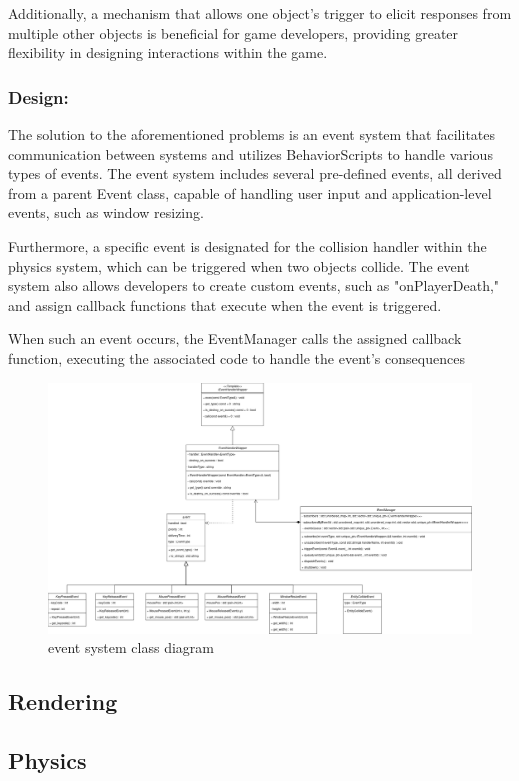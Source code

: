 \documentclass{projdoc}
\begin{document}
Additionally, a mechanism that allows one object's trigger to elicit responses from multiple other objects is beneficial for game developers, providing greater flexibility in designing interactions within the game.

\subsubsection{Design:}
The solution to the aforementioned problems is an event system that facilitates communication between systems and utilizes BehaviorScripts to handle various types of events. The event system includes several pre-defined events, all derived from a parent Event class, capable of handling user input and application-level events, such as window resizing.

Furthermore, a specific event is designated for the collision handler within the physics system, which can be triggered when two objects collide. The event system also allows developers to create custom events, such as "onPlayerDeath," and assign callback functions that execute when the event is triggered.

When such an event occurs, the EventManager calls the assigned callback function, executing the associated code to handle the event's consequences
\begin{figure}
    \centering
    \includegraphics[width=\linewidth]{img/event-uml.drawio.png}  %
    \caption{event system class diagram}
    \label{fig:event-uml}
\end{figure}
\subsection{Rendering}

\subsection{Physics}
\end{document}
